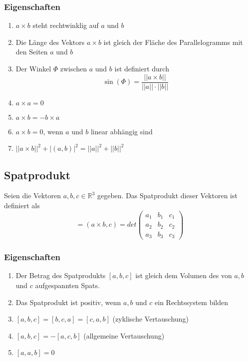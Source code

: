 \documentclass[a4paper,twocolumn,10pt]{article}
\begin{document}
\subsubsection{Eigenschaften}
\begin{enumerate}
\item $a\times b$ steht rechtwinklig auf $a$ und $b$
\item Die Länge des Vektors $a\times b$ ist gleich der Fläche des Parallelogramms mit den Seiten $a$ und $b$
\item Der Winkel $\Phi$ zwischen $a$ und $b$ ist definiert durch
\begin{equation*}
\sin(\Phi)=\frac{||a\times b||}{||a||\cdot ||b||}
\end{equation*}
\item $a\times a=0$
\item $a\times b=-b\times a$
\item $a\times b=0$, wenn $a$ und $b$ linear abhängig sind
\item $||a\times b||^2 +|(a,b)|^2=||a||^2 +||b||^2 $
\end{enumerate}

\subsection{Spatprodukt}
Seien die Vektoren $a,b,c\in \mathbb{R}^3$ gegeben. Das Spatprodukt dieser Vektoren ist definiert als
\begin{equation*}
[a,b,c]=(a\times b,c)=det\begin{pmatrix}a_1 & b_1 & c_1 \\ a_2 & b_2 & c_2 \\ a_3 & b_3 & c_3\end{pmatrix}
\end{equation*}

\subsubsection{Eigenschaften}
\begin{enumerate}
\item Der Betrag des Spatprodukts $[a,b,c]$ ist gleich dem Volumen des von $a,b$ und $c$ aufgespannten Spats.
\item Das Spatprodukt ist positiv, wenn $a,b$ und $c$ ein Rechtssystem bilden
\item $[a,b,c]=[b,c,a]=[c,a,b]$ (zyklische Vertauschung)
\item $[a,b,c]=-[a,c,b]$ (allgemeine Vertauschung)
\item $[a,a,b]=0$
\end{enumerate}
\end{document}
